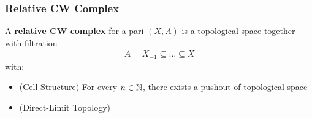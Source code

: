 \documentclass[Total.tex]{subfiles}
\begin{document}
	\subsubsection{Relative CW Complex}
	\begin{Def}
		A \textbf{relative CW complex} for a pari $(X,A)$ is a topological space together with filtration
		\begin{gather*}
			A=X_{-1}\subseteq \dots\subseteq X
		\end{gather*}
		with:
		\begin{itemize}
			\item (Cell Structure) For every $n\in \mathbb{N}$, there exists a pushout of topological space
			\begin{center}
			\end{center}
			\item (Direct-Limit Topology)
		\end{itemize}
	\end{Def}
\end{document}
